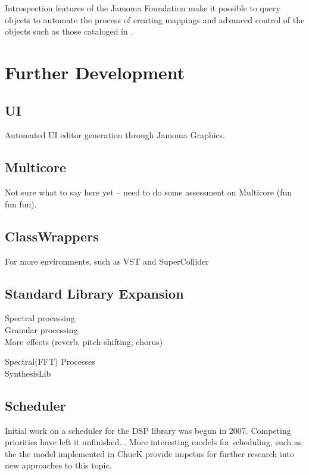 \documentclass[twoside,10pt]{article}
\begin{document}
Introspection features of the Jamoma Foundation make it possible to query objects to automate the process of creating mappings and advanced control of the objects such as those cataloged in \cite{Pendharkar:2006}.  




\section{Further Development} %

\subsection{UI}

Automated UI editor generation through Jamoma Graphics.

\subsection{Multicore}

Not sure what to say here yet -- need to do some assessment on Multicore (fun fun fun).

\subsection{ClassWrappers}

For more environments, such as VST and SuperCollider

\subsection{Standard Library Expansion}

Spectral processing \\

Granular processing   \\

More effects (reverb, pitch-shifting, chorus) 


Spectral(FFT) Processes\\

SynthesisLib

\subsection{Scheduler}

Initial work on a scheduler for the DSP library was begun in 2007.  Competing priorities have left it unfinished...  More interesting models for scheduling, such as the the model implemented in ChucK provide impetus for further research into new approaches to this topic.
\end{document}
